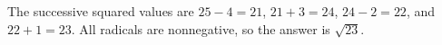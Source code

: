 The successive squared values are $25-4=21$, $21+3=24$, $24-2=22$, and $22+1=23$. All radicals are nonnegative, so the answer is $\boxed{\sqrt{23}}$.

